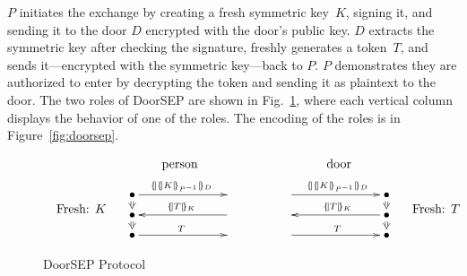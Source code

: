 $P$ initiates the exchange by creating a fresh symmetric key~$K$,
signing it, and sending it to the door $D$ encrypted with the door's
public key.  $D$ extracts the symmetric key after checking the
signature, freshly generates a token~$T$, and sends it---encrypted
with the symmetric key---back to $P$.  $P$ demonstrates they are
authorized to enter by decrypting the token and sending it as
plaintext to the door.  The two roles of DoorSEP are shown in
Fig.~\ref{fig:doorsep protocol}, where each vertical column displays
the behavior of one of the roles.  The {\cpsa} encoding of the roles is
in Figure~\ref{fig:doorsep}.

\begin{figure}[tb]
  \[\begin{array}[c]{rc@{\qquad\qquad}cl}
      & \mbox{person}
      &\mbox{door}
      &\\
      \begin{array}[c]{r} ~ \\ ~ \\
        \mbox{Fresh: $K$}
      \end{array}
      & \xymatrix@R=2mm@C=7em{
      \bullet\ar@{=>}[d]\ar[r]^{\enc{\enc{K}{\iv{P}}}{D}}
      &\\
      \bullet\ar@{=>}[d]& \ar[l]_{\enc{T}{K}}\\
      \bullet \ar[r]^T & }
      &
        \xymatrix@R=2mm@C=7em{
        \ar[r]^{\enc{\enc{K}{\iv{P}}}{D}}    &\bullet\ar@{=>}[d]\\
      &\bullet\ar@{=>}[d] \ar[l]_{\enc{T}{K}}\\
      \ar[r]^T      &\bullet}
      &
        \begin{array}[c]{r} ~ \\ ~ \\
          \mbox{Fresh: $T$}
        \end{array}
  \end{array}\]
  \caption{DoorSEP Protocol}\label{fig:doorsep protocol}
\end{figure}


